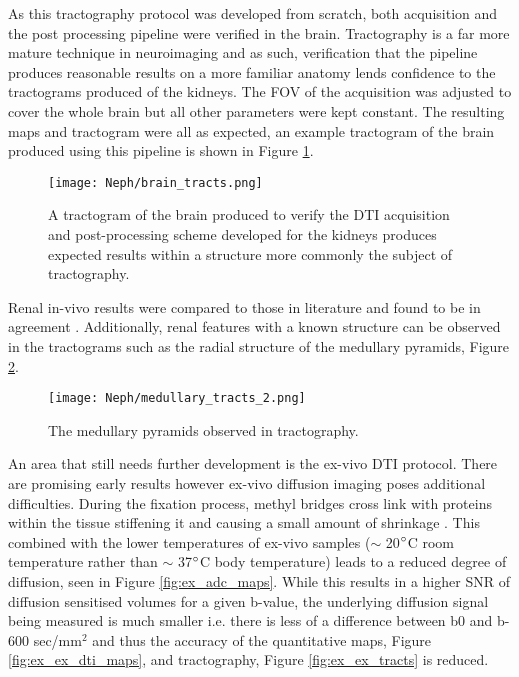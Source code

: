 As this tractography protocol was developed from scratch, both acquisition and the post processing pipeline were verified in the brain. Tractography is a far more mature technique in neuroimaging and as such, verification that the pipeline produces reasonable results on a more familiar anatomy lends confidence to the tractograms produced of the kidneys. The \ac{FOV} of the acquisition was adjusted to cover the whole brain but all other parameters were kept constant. The resulting maps and tractogram were all as expected, an example tractogram of the brain produced using this pipeline is shown in Figure \ref{fig:ex_dti_brain_tracts}.

\begin{figure}[H]
	\centering
	\texttt{[image: Neph/brain\_tracts.png]}
	\caption{A tractogram of the brain produced to verify the \ac{DTI} acquisition and post-processing scheme developed for the kidneys produces expected results within a structure more commonly the subject of tractography.}
	\label{fig:ex_dti_brain_tracts}	
\end{figure}

Renal in-vivo results were compared to those in literature and found to be in agreement \cite{gurses_diffusion_2011, jaimes_diffusion_2014, notohamiprodjo_diffusion_2010}. Additionally, renal features with a known structure can be observed in the tractograms such as the radial structure of the medullary pyramids, Figure \ref{fig:ex_dti_medulla_tracts}.

\begin{figure}[H]
	\centering
	\texttt{[image: Neph/medullary\_tracts\_2.png]} %
	\caption{The medullary pyramids observed in tractography.}
	\label{fig:ex_dti_medulla_tracts}	
\end{figure}

An area that still needs further development is the ex-vivo \ac{DTI} protocol. There are promising early results however ex-vivo diffusion imaging poses additional difficulties. During the fixation process, methyl bridges cross link with proteins within the tissue stiffening it and causing a small amount of shrinkage \cite{thavarajah_chemical_2012}. This combined with the lower temperatures of ex-vivo samples ($\sim$ 20$\degree$C room temperature rather than $\sim$ 37$\degree$C body temperature) leads to a reduced degree of diffusion, seen in Figure \ref{fig:ex_adc_maps}. While this results in a higher \ac{SNR} of diffusion sensitised volumes for a given b-value, the underlying diffusion signal being measured is much smaller i.e. there is less of a difference between b0 and b-600 sec/mm$^2$ and thus the accuracy of the quantitative maps, Figure \ref{fig:ex_ex_dti_maps}, and tractography, Figure \ref{fig:ex_ex_tracts} is reduced.

